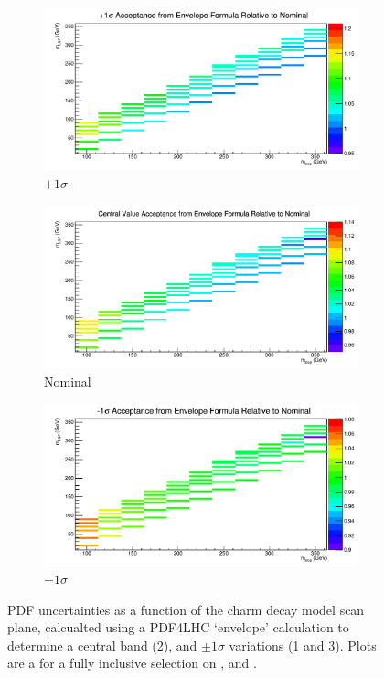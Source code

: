 \begin{figure}[ht!]
  \centering
  \begin{subfigure}[b]{0.6\textwidth}
    \includegraphics[width=\textwidth]{Figs/sms/t2cc/v37/systs/acc_pSigmaRel_m0_m12}
    \caption{$+1\sigma$}
    \label{fig:sms-pdf-up-t2cc}
  \end{subfigure}
  \begin{subfigure}[b]{0.6\textwidth}
    \includegraphics[width=\textwidth]{Figs/sms/t2cc/v37/systs/acc_cvRel_m0_m12}
    \caption{Nominal}
    \label{fig:sms-pdf-nominal-t2cc}
  \end{subfigure}
  \begin{subfigure}[b]{0.6\textwidth}
    \includegraphics[width=\textwidth]{Figs/sms/t2cc/v37/systs/acc_mSigmaRel_m0_m12}
    \caption{$-1\sigma$}
    \label{fig:sms-pdf-down-t2cc}
  \end{subfigure}
  \caption{PDF uncertainties as a function of the charm decay model scan plane,
  calcualted using a PDF4LHC `envelope' calculation to determine a central band
  (\ref{fig:sms-pdf-nominal-t2cc}), and $\pm1\sigma$ variations
  (\ref{fig:sms-pdf-up-t2cc} and \ref{fig:sms-pdf-down-t2cc}). Plots are a for
  a fully inclusive selection on \HT, \nj and \nb.}
  \label{fig:sms-pdf-t2cc}
\end{figure}


